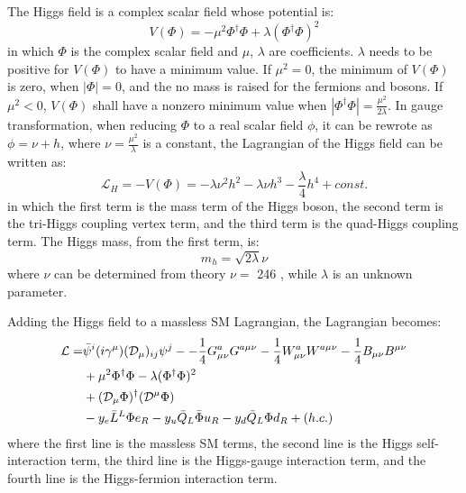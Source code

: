 The Higgs field is a complex scalar field whose potential is:
\begin{equation} \label{eq:Higgs_potential}
    V(\Phi) = - \mu^{2} \Phi^{\dagger}\Phi + \lambda(\Phi^{\dagger}\Phi)^{2}
\end{equation}
in which $\Phi$ is the complex scalar field and $\mu$, $\lambda$ are coefficients.
$\lambda$ needs to be positive for $V(\Phi)$ to have a minimum value.
If $\mu^{2} = 0$, the minimum of $V(\Phi)$ is zero, when $|\Phi| = 0$,
and the no mass is raised for the fermions and bosons.
If $\mu^{2} < 0$, $V(\Phi)$ shall have a nonzero minimum value when $|\Phi^{\dagger}\Phi| = \frac{\mu^{2}}{2\lambda}$.
In gauge transformation, when reducing $\Phi$ to a real scalar field $\phi$,
it can be rewrote as $\phi = \nu + h$, where $\nu = \frac{\mu^{2}}{\lambda}$ is a constant,
the Lagrangian of the Higgs field can be written as:
\begin{equation}\label{eq:Higgs_Lagrangian}
    \mathcal{L}_{H} = - V(\Phi) = -\lambda \nu^{2} h^{2} - \lambda \nu h^{3} - \frac{\lambda}{4} h^{4} + const.
\end{equation}
in which the first term is the mass term of the Higgs boson, the second term is the tri-Higgs coupling vertex term,
and the third term is the quad-Higgs coupling term.
The Higgs mass, from the first term, is:
\begin{equation}\label{eq:Higgs_mass}
    m_{h} = \sqrt{2 \lambda} \nu   
\end{equation}
where $\nu$ can be determined from theory $\nu = $ 246 \GeV, while $\lambda$ is an unknown parameter.

Adding the Higgs field to a massless SM Lagrangian, the Lagrangian becomes:
\begin{equation}\label{eq:SM_Lagrangian_Higgs}
  \begin{split}
    \mathcal{L} = & \bar{\psi}^{i} (i\gamma^{\mu})(\mathcal{D}_{\mu})_{ij}\psi^{j} -
                  - \frac{1}{4} G^{a}_{\mu\nu}G^{a\mu\nu}
                  - \frac{1}{4} W^{a}_{\mu\nu}W^{a\mu\nu}
                  - \frac{1}{4} B_{\mu\nu}B^{\mu\nu} \\
                & + \mu^{2} \Phi^{\dagger}\Phi - \lambda (\Phi^{\dagger}\Phi)^{2} \\
                & + (\mathcal{D}_{\mu}\Phi)^{\dagger} (\mathcal{D}^{\mu}\Phi)  \\
                & - y_{e} \bar{L}^{L} \Phi{} e_{R}
                  - y_{u} \bar{Q}_{L} \bar{\Phi} u_{R}
                  - y_{d} \bar{Q}_{L} \Phi{} d_{R} + \text(h.c.)
  \end{split} 
\end{equation}
where the first line is the massless SM terms, the second line is the Higgs self-interaction term,
the third line is the Higgs-gauge interaction term, and the fourth line is the Higgs-fermion interaction term.


